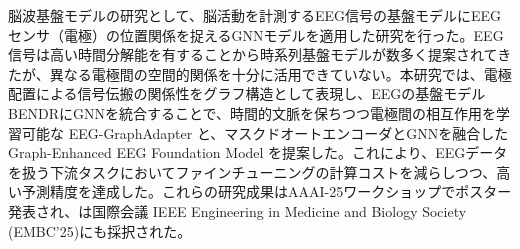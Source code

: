 脳波基盤モデルの研究として、脳活動を計測するEEG信号の基盤モデルにEEGセンサ（電極）の位置関係を捉えるGNNモデルを適用した研究を行った。EEG信号は高い時間分解能を有することから時系列基盤モデルが数多く提案されてきたが、異なる電極間の空間的関係を十分に活用できていない。本研究では、電極配置による信号伝搬の関係性をグラフ構造として表現し、EEGの基盤モデルBENDRにGNNを統合することで、時間的文脈を保ちつつ電極間の相互作用を学習可能な EEG-GraphAdapter \cite{ega} と、マスクドオートエンコーダとGNNを融合したGraph-Enhanced EEG Foundation Model \cite{gefm} を提案した。これにより、EEGデータを扱う下流タスクにおいてファインチューニングの計算コストを減らしつつ、高い予測精度を達成した。これらの研究成果はAAAI-25ワークショップでポスター発表され、\cite{gefm}は国際会議 IEEE Engineering in Medicine and Biology Society (EMBC’25)にも採択された。







